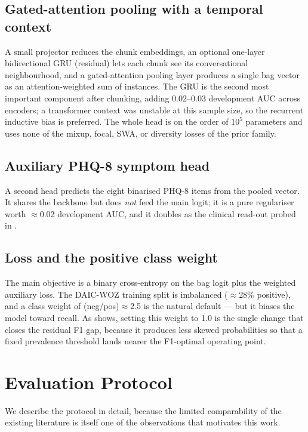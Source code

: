 \documentclass[conference]{IEEEtran}
\begin{document}
\subsection{Gated-attention pooling with a temporal context}
A small projector reduces the chunk embeddings, an optional one-layer
bidirectional GRU (residual) lets each chunk see its conversational
neighbourhood, and a gated-attention pooling layer \cite{ilse2018} produces a
single bag vector as an attention-weighted sum of instances. The GRU is the
second most important component after chunking, adding 0.02--0.03 development
AUC across encoders; a transformer context was unstable at this sample size, so
the recurrent inductive bias is preferred. The whole head is on the order of
$10^5$ parameters and uses none of the mixup, focal, SWA, or diversity losses
of the prior family.

\subsection{Auxiliary PHQ-8 symptom head}
A second head predicts the eight binarised PHQ-8 items from the pooled vector.
It shares the backbone but does \emph{not} feed the main logit; it is a pure
regulariser worth $\approx$0.02 development AUC, and it doubles as the
clinical read-out probed in .

\subsection{Loss and the positive class weight}
The main objective is a binary cross-entropy on the bag logit plus the
weighted auxiliary loss. The DAIC-WOZ training split is imbalanced
($\approx$28\% positive), and a class weight of (neg/pos)$\approx$2.5 is the
natural default --- but it biases the model toward recall. As
 shows, setting this weight to 1.0 is the single
change that closes the residual F1 gap, because it produces less skewed
probabilities so that a fixed prevalence threshold lands nearer the
F1-optimal operating point.

\section{Evaluation Protocol}
\label{sec:protocol}

We describe the protocol in detail, because the limited comparability of the
existing literature is itself one of the observations that motivates this work.
\end{document}
